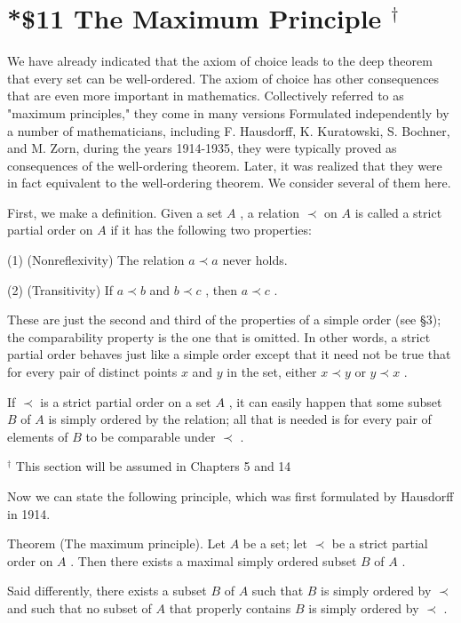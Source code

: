 \section*{*\$11 The Maximum Principle \({}^{ \dagger  }\)}

We have already indicated that the axiom of choice leads to the deep theorem that every set can be well-ordered. The axiom of choice has other consequences that are even more important in mathematics. Collectively referred to as "maximum principles," they come in many versions Formulated independently by a number of mathematicians, including F. Hausdorff, K. Kuratowski, S. Bochner, and M. Zorn, during the years 1914-1935, they were typically proved as consequences of the well-ordering theorem. Later, it was realized that they were in fact equivalent to the well-ordering theorem. We consider several of them here.

First, we make a definition. Given a set \(A\) , a relation \(\prec\) on \(A\) is called a strict partial order on \(A\) if it has the following two properties:

(1) (Nonreflexivity) The relation \(a \prec  a\) never holds.

(2) (Transitivity) If \(a \prec  b\) and \(b \prec  c\) , then \(a \prec  c\) .

These are just the second and third of the properties of a simple order (see §3); the comparability property is the one that is omitted. In other words, a strict partial order behaves just like a simple order except that it need not be true that for every pair of distinct points \(x\) and \(y\) in the set, either \(x \prec  y\) or \(y \prec  x\) .

If \(\prec\) is a strict partial order on a set \(A\) , it can easily happen that some subset \(B\) of \(A\) is simply ordered by the relation; all that is needed is for every pair of elements of \(B\) to be comparable under \(\prec\) .


\({}^{ \dagger  }\) This section will be assumed in Chapters 5 and 14



Now we can state the following principle, which was first formulated by Hausdorff in 1914.

Theorem (The maximum principle). Let \(A\) be a set; let \(\prec\) be a strict partial order on \(A\) . Then there exists a maximal simply ordered subset \(B\) of \(A\) .

Said differently, there exists a subset \(B\) of \(A\) such that \(B\) is simply ordered by \(\prec\) and such that no subset of \(A\) that properly contains \(B\) is simply ordered by \(\prec\) .


